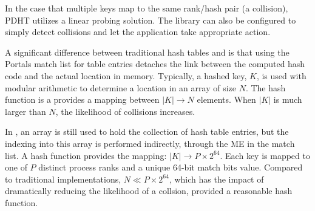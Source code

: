 In the case that multiple keys map to the same rank/hash pair (a
collision), PDHT utilizes a linear probing solution. The library can
also be configured to simply detect collisions and let the application
take appropriate action. 

A significant difference between traditional hash tables and \pdht is
that using the Portals match list for table entries detaches the link
between the computed hash code and the actual location in
memory. Typically, a hashed key, $K$,  is used with modular arithmetic to
determine a location in an array of size $N$. The hash function is a
provides a mapping between $|K| \rightarrow N$ elements. When $|K|$ is
much larger than $N$, the likelihood of collisions increases.

In \pdht, an array is still used to hold the collection of hash table
entries, but the indexing into this array is performed indirectly,
through the ME in the match list. A \pdht hash function provides the 
mapping: $|K| \rightarrow P \times 2^{64}$. Each key is mapped to one
of $P$ distinct process ranks and a unique 64-bit match bits
value. Compared to traditional implementations, $N \ll  P \times
2^{64}$, which has the impact of dramatically reducing the likelihood
of a collsion, provided a reasonable hash function.


